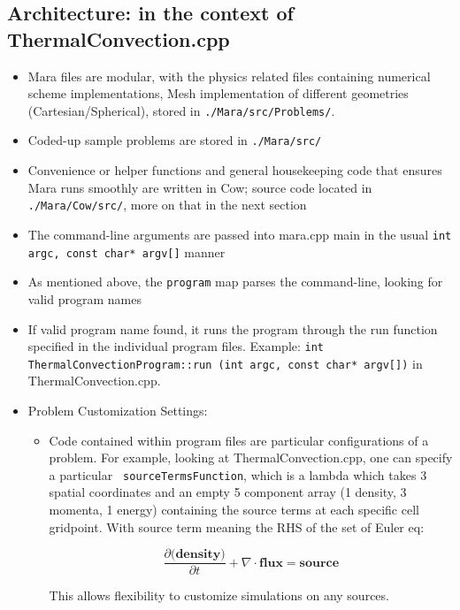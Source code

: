 \documentclass{article}
\begin{document}
\subsection{Architecture: in the context of ThermalConvection.cpp}
\begin{itemize}
	\item Mara files are modular, with the physics related files containing numerical scheme implementations, Mesh implementation of different geometries (Cartesian/Spherical), stored in \texttt{./Mara/src/Problems/}. 
	
	\item Coded-up sample problems are stored in \texttt{./Mara/src/}
	
	\item Convenience or helper functions and general housekeeping code that ensures Mara runs smoothly are written in Cow; source code located in \texttt{./Mara/Cow/src/}, more on that in the next section
	
	\item The command-line arguments are passed into mara.cpp main in the usual \texttt{int argc, const char* argv[]} manner
	
	\item As mentioned above, the \texttt{program} map parses the command-line, looking for valid program names
	
	\item If valid program name found, it runs the program through the run function specified in the individual program files. Example: \texttt{int ThermalConvectionProgram::run (int argc, const char* argv[])} in ThermalConvection.cpp.

	\item Problem Customization Settings:
		
	\begin{itemize}
		\item Code contained within program files are particular configurations of a problem. For example, looking at ThermalConvection.cpp, one can specify a particular \texttt{ sourceTermsFunction}, which is a lambda which takes 3 spatial coordinates and an empty 5 component array (1 density, 3 momenta, 1 energy) containing the source terms at each specific cell gridpoint. With source term meaning the RHS of the set of Euler eq:
	
	$$\frac{\partial \textbf{(density)}}{\partial t} + \nabla \cdot \textbf{flux} = \textbf{source}$$
	
	This allows flexibility to customize simulations on any sources.
	

\end{itemize}
\end{itemize}
\end{document}
